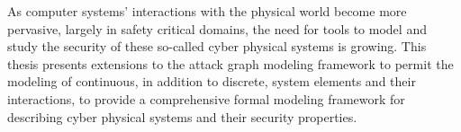 As computer systems' interactions with the physical world become more pervasive,
largely in safety critical domains, the need for tools to model and study the security
of these so-called cyber physical systems is growing. This thesis presents extensions
to the attack graph modeling framework to permit the modeling of continuous, in addition
to discrete, system elements and their interactions, to provide a comprehensive
formal modeling framework for describing cyber physical systems and their security properties.
